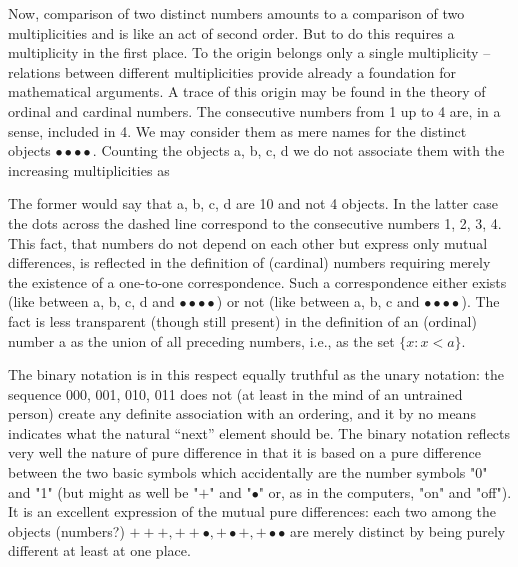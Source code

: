 Now, comparison of two distinct numbers amounts to a comparison of two multiplicities and is like an act of second order. But to do this requires a multiplicity in the first place. To the origin belongs only a single multiplicity -- relations between different multiplicities provide already a foundation for mathematical arguments. A trace of this origin may be found in the theory of ordinal and cardinal numbers. The consecutive numbers from 1 up to 4 are, in a sense, included in 4. We may consider them as mere names for the distinct objects 
$\bullet\bullet\bullet\bullet$. Counting the objects a, b, c, d we do not associate them with the increasing multiplicities as  
\begin{center}

\end{center}
The former would say that a, b, c, d are 10 and not 4 objects. In the latter case the dots across the dashed line correspond to the consecutive numbers 1, 2, 3, 4. This fact, that numbers do not depend on each other but express only mutual differences, is reflected in the definition of (cardinal) numbers requiring merely the existence of a one-to-one correspondence. Such a correspondence either exists (like between a, b, c, d and $\bullet\bullet\bullet\bullet$) or not (like between a, b, c and  $\bullet\bullet\bullet\bullet$). The fact is less transparent (though still present) in the definition of an (ordinal) number a as the union of all preceding numbers, i.e., as the set $\{ x : x<a \}.$  

The binary notation is in this respect equally truthful as the unary notation: the sequence 000, 001, 010, 011 does not (at least in the mind of an untrained person) create any definite association with an ordering, and it by no means indicates what the natural ``next'' element should be. The binary notation reflects very well the nature of pure difference in that it is based on a pure difference between the two basic symbols which accidentally are the number symbols "0" and "1" (but might as well be "$+$" and "$\bullet$" or, as in the computers, "on" and "off"). It is an excellent expression of the mutual pure differences: each two among the objects (numbers?) $+++, ++\bullet, +\bullet+, +\bullet\bullet$ are merely distinct by being purely different at least at one place.

